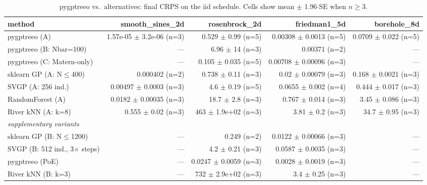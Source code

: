 \begin{table}[h]
\centering
\caption{pygptreeo vs.\ alternatives: final CRPS on the iid schedule. Cells show mean $\pm$ 1.96$\cdot$SE when $n\geq 3$.}
\begin{tabular}{lrrrr}
\toprule
method & smooth\_sines\_2d & rosenbrock\_2d & friedman1\_5d & borehole\_8d \\
\midrule
pygptreeo (A) & 1.57e-05 $\pm$ 3.2e-06 (n=3) & 0.529 $\pm$ 0.99 (n=5) & 0.00308 $\pm$ 0.0013 (n=5) & 0.0709 $\pm$ 0.022 (n=5) \\
pygptreeo (B: Nbar=100) & --- & 6.96 $\pm$ 14 (n=3) & 0.00371 (n=2) & --- \\
pygptreeo (C: Matern-only) & --- & 0.105 $\pm$ 0.035 (n=5) & 0.00708 $\pm$ 0.00096 (n=3) & --- \\
sklearn GP (A: N$\leq$400) & 0.000402 (n=2) & 0.738 $\pm$ 0.11 (n=3) & 0.02 $\pm$ 0.00079 (n=3) & 0.168 $\pm$ 0.0021 (n=3) \\
SVGP (A: 256 ind.) & 0.00497 $\pm$ 0.0003 (n=3) & 4.6 $\pm$ 0.19 (n=5) & 0.0655 $\pm$ 0.002 (n=4) & 0.444 $\pm$ 0.017 (n=3) \\
RandomForest (A) & 0.0182 $\pm$ 0.00035 (n=3) & 18.7 $\pm$ 2.8 (n=3) & 0.767 $\pm$ 0.014 (n=3) & 3.45 $\pm$ 0.086 (n=3) \\
River kNN (A: k=8) & 0.555 $\pm$ 0.02 (n=3) & 463 $\pm$ 1.9e+02 (n=3) & 3.81 $\pm$ 0.2 (n=3) & 34.7 $\pm$ 0.95 (n=3) \\
\midrule
\multicolumn{5}{l}{\textit{supplementary variants}} \\
sklearn GP (B: N$\leq$1200) & --- & 0.249 (n=2) & 0.0122 $\pm$ 0.00066 (n=3) & --- \\
SVGP (B: 512 ind., 3$\times$ steps) & --- & 4.2 $\pm$ 0.21 (n=3) & 0.0587 $\pm$ 0.0035 (n=3) & --- \\
pygptreeo (PoE) & --- & 0.0247 $\pm$ 0.0059 (n=3) & 0.0028 $\pm$ 0.0019 (n=3) & --- \\
River kNN (B: k=3) & --- & 732 $\pm$ 2.9e+02 (n=3) & 3.4 $\pm$ 0.25 (n=3) & --- \\
\bottomrule
\end{tabular}
\end{table}

